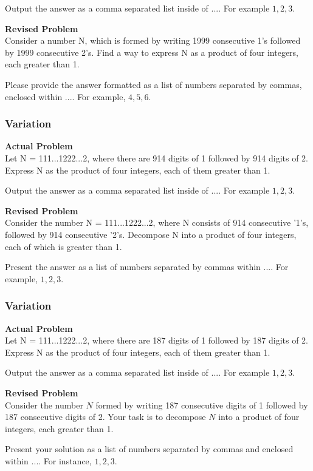 Output the answer as a comma separated list inside of $\boxed{...}$. For example $\boxed{1, 2, 3}$.

\textbf{Revised Problem}\\
Consider a number N, which is formed by writing 1999 consecutive 1's followed by 1999 consecutive 2's. Find a way to express N as a product of four integers, each greater than 1.

Please provide the answer formatted as a list of numbers separated by commas, enclosed within $\boxed{...}$. For example, $\boxed{4, 5, 6}$.

\subsubsection{Variation}
\textbf{Actual Problem}\\
Let N = 111...1222...2, where there are 914 digits of 1 followed by 914 digits of 2.
Express N as the product of four integers, each of them greater than 1.

Output the answer as a comma separated list inside of $\boxed{...}$. For example $\boxed{1, 2, 3}$.

\textbf{Revised Problem}\\
Consider the number N = 111...1222...2, where N consists of 914 consecutive '1's, followed by 914 consecutive '2's. Decompose N into a product of four integers, each of which is greater than 1.

Present the answer as a list of numbers separated by commas within $\boxed{...}$. For example, $\boxed{1, 2, 3}$.

\subsubsection{Variation}
\textbf{Actual Problem}\\
Let N = 111...1222...2, where there are 187 digits of 1 followed by 187 digits of 2.
Express N as the product of four integers, each of them greater than 1.

Output the answer as a comma separated list inside of $\boxed{...}$. For example $\boxed{1, 2, 3}$.

\textbf{Revised Problem}\\
Consider the number \( N \) formed by writing 187 consecutive digits of 1 followed by 187 consecutive digits of 2. Your task is to decompose \( N \) into a product of four integers, each greater than 1.

Present your solution as a list of numbers separated by commas and enclosed within \(\boxed{...}\). For instance, \(\boxed{1, 2, 3}\).

